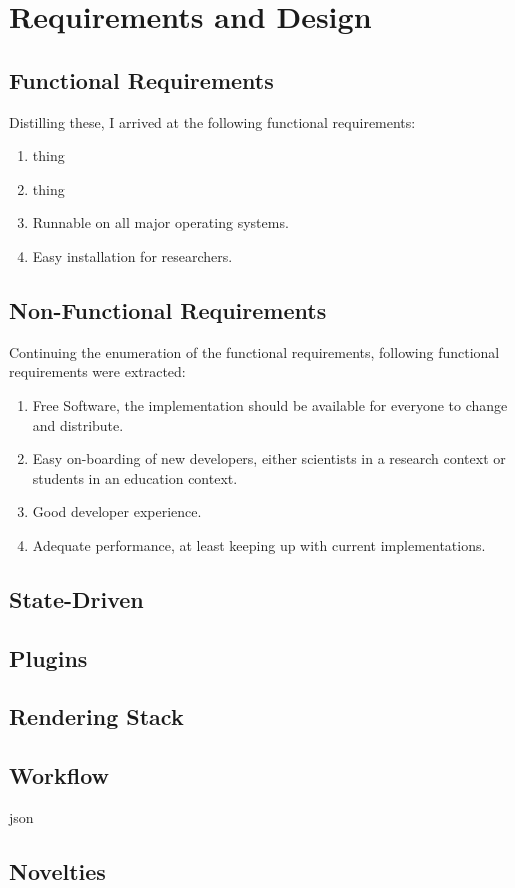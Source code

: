 \section{Requirements and Design}
\subsection{Functional Requirements}


Distilling these, I arrived at the following functional requirements:
\begin{enumerate}
\item thing \label{req0}
\item thing
\item Runnable on all major operating systems. \label{req_system}
\item Easy installation for researchers. \label{req_install}
\end{enumerate}


\subsection{Non-Functional Requirements}
Continuing the enumeration of the functional requirements, following functional
requirements were extracted:
\begin{enumerate}[resume]
\item  Free Software, the implementation should be available for everyone to
  change and distribute. \label{req_os}
\item Easy on-boarding of new developers, either scientists in a research context
  or students in an education context. \label{req_easy}
\item Good developer experience. \label{req_dx}
\item Adequate performance, at least keeping up with current implementations. \label{req_performance}

\end{enumerate}



\subsection{State-Driven}
\subsection{Plugins}
\subsection{Rendering Stack}

\subsection{Workflow}
json

\subsection{Novelties}
